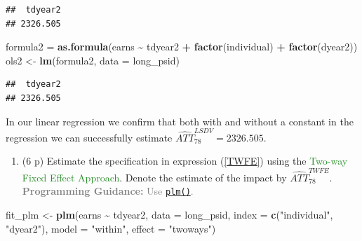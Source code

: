 \documentclass[
]{article}
\newenvironment{Shaded}{\begin{snugshade}}{\end{snugshade}}
\newcommand{\AttributeTok}[1]{\textcolor[rgb]{0.13,0.29,0.53}{#1}}
\newcommand{\FunctionTok}[1]{\textcolor[rgb]{0.13,0.29,0.53}{\textbf{#1}}}
\newcommand{\NormalTok}[1]{#1}
\newcommand{\OtherTok}[1]{\textcolor[rgb]{0.56,0.35,0.01}{#1}}
\newcommand{\SpecialCharTok}[1]{\textcolor[rgb]{0.81,0.36,0.00}{\textbf{#1}}}
\newcommand{\StringTok}[1]{\textcolor[rgb]{0.31,0.60,0.02}{#1}}
\providecommand{\tightlist}{%
  \setlength{\itemsep}{0pt}\setlength{\parskip}{0pt}}
\begin{document}
\begin{verbatim}
##  tdyear2 
## 2326.505
\end{verbatim}

\begin{Shaded}
\begin{Highlighting}[]
\NormalTok{formula2 }\OtherTok{=} \FunctionTok{as.formula}\NormalTok{(earns }\SpecialCharTok{\textasciitilde{}}\NormalTok{ tdyear2 }\SpecialCharTok{+} \FunctionTok{factor}\NormalTok{(individual) }\SpecialCharTok{+} \FunctionTok{factor}\NormalTok{(dyear2))}
\NormalTok{ols2 }\OtherTok{\textless{}{-}} \FunctionTok{lm}\NormalTok{(formula2, }\AttributeTok{data =}\NormalTok{ long\_psid)}
\end{Highlighting}
\end{Shaded}

\begin{Shaded}
\end{Shaded}

\begin{verbatim}
##  tdyear2 
## 2326.505
\end{verbatim}

In our linear regression we confirm that both with and without a
constant in the regression we can successfully estimate
\(\widehat{ATT}_{78}^{LSDV} = 2326.505\).

\begin{enumerate}
\def\labelenumi{\arabic{enumi}.}
\setcounter{enumi}{3}
\tightlist
\item
  (6 p) Estimate the specification in expression (\ref{TWFE}) using the
  \textcolor{ForestGreen}{Two-way Fixed Effect Approach}. Denote the
  estimate of the impact by \(\widehat{ATT}_{78}^{TWFE}\).
  \textcolor{Gray}{\textbf{Programming Guidance:} Use \href{https://www.rdocumentation.org/packages/plm/versions/2.6-3/topics/plm}{\texttt{plm()}}.}\label{item:twfe}
\end{enumerate}

\begin{Shaded}
\begin{Highlighting}[]
\NormalTok{fit\_plm }\OtherTok{\textless{}{-}} \FunctionTok{plm}\NormalTok{(earns }\SpecialCharTok{\textasciitilde{}}\NormalTok{ tdyear2, }
              \AttributeTok{data =}\NormalTok{ long\_psid, }
              \AttributeTok{index =} \FunctionTok{c}\NormalTok{(}\StringTok{"individual"}\NormalTok{, }\StringTok{"dyear2"}\NormalTok{), }
              \AttributeTok{model =} \StringTok{"within"}\NormalTok{, }
              \AttributeTok{effect =} \StringTok{"twoways"}\NormalTok{)}
\end{Highlighting}
\end{Shaded}
\end{document}
